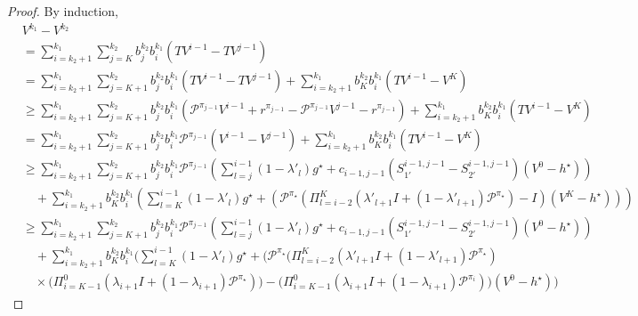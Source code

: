\documentclass{article} %
\newcommand{\cP}{\mathcal{P}}
\newcommand*{\para}[1]{\left({#1}\right)}
\begin{document}
\begin{proof}


By induction,
    \begin{align*}
        &V^{k_1}-V^{k_2} 
        \\&=\sum^{k_1}_{i=k_2+1} \sum^{k_2}_{j=K}b^{k_2}_j  b^{k_1}_i (TV^{i-1}-TV^{j-1})
         \\& = \sum^{k_1}_{i=k_2+1} \sum^{k_2}_{j=K+1} b^{k_2}_j  b^{k_1}_i(TV^{i-1}-TV^{j-1})+\sum^{k_1}_{i=k_2+1} b^{k_2}_{K}  b^{k_1}_i (TV^{i-1}-V^{K})
        \\& \ge \sum^{k_1}_{i=k_2+1} \sum^{k_2}_{j=K+1}b^{k_2}_j  b^{k_1}_i (\cP^{\pi_{j-1}}V^{i-1}+r^{\pi_{j-1}}-\cP^{\pi_{j-1}}V^{j-1}-r^{\pi_{j-1}})+\sum^{k_1}_{i=k_2+1} b^{k_2}_{K}  b^{k_1}_i (TV^{i-1}-V^{K})
        \\& = \sum^{k_1}_{i=k_2+1} \sum^{k_2}_{j=K+1} b^{k_2}_j  b^{k_1}_i\cP^{\pi_{j-1}} (V^{i-1}-V^{j-1})+\sum^{k_1}_{i=k_2+1} b^{k_2}_{K}  b^{k_1}_i (TV^{i-1}-V^{K})
        \\& \ge \sum^{k_1}_{i=k_2+1} \sum^{k_2}_{j=K+1} b^{k_2}_j  b^{k_1}_i\cP^{\pi_{j-1}} \para{ \sum^{i-1}_{l=j} (1-\lambda'_{l})g^{\star}+c_{i-1, j-1}(S^{i-1,j-1}_{1'}-S^{i-1,j-1}_{2'})(V^0-h^{\star}) }
        \\&\quad + \sum^{k_1}_{i=k_2+1} b^{k_2}_{K}  b^{k_1}_i \para{\sum^{i-1}_{l=K} (1-\lambda'_{l})g^{\star}+\para{\cP^{\pi_{\star}}\para{ \Pi^{K}_{l=i-2}(\lambda'_{l+1}I+(1-\lambda'_{l+1}) \cP^{\pi_{\star}})-I} (V^K-h^{\star})}}
               \end{align*}
        \begin{align*}
        & \ge \sum^{k_1}_{i=k_2+1} \sum^{k_2}_{j=K+1} b^{k_2}_j  b^{k_1}_i\cP^{\pi_{j-1}} \para{ \sum^{i-1}_{l=j} (1-\lambda'_{l})g^{\star}+c_{i-1, j-1}(S^{i-1,j-1}_{1'}-S^{i-1,j-1}_{2'})(V^0-h^{\star}) }
        \\&\quad + \sum^{k_1}_{i=k_2+1} b^{k_2}_{K}  b^{k_1}_i \Bigg(\sum^{i-1}_{l=K} (1-\lambda'_{l})g^{\star}+\bigg(\cP^{\pi_{\star}}\bigg( \Pi^{K}_{l=i-2}(\lambda'_{l+1}I+(1-\lambda'_{l+1}) \cP^{\pi_{\star}})
        \\& \quad \times (\Pi^{0}_{i=K-1}(\lambda_{i+1}I+(1-\lambda_{i+1}) \cP^{\pi_{\star}})\bigg)-( \Pi^{0}_{i=K-1}(\lambda_{i+1}I+(1-\lambda_{i+1}) \cP^{\pi_i})\bigg)(V^0-h^{\star}) \Bigg)

\end{align*}
\end{proof}
\end{document}

